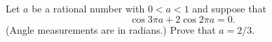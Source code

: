Let $a$ be a rational number with $0 < a < 1$ and suppose that
\[ \cos 3\pi a + 2\cos 2\pi a = 0. \]
(Angle measurements are in radians.) Prove that $a = 2/3$.

